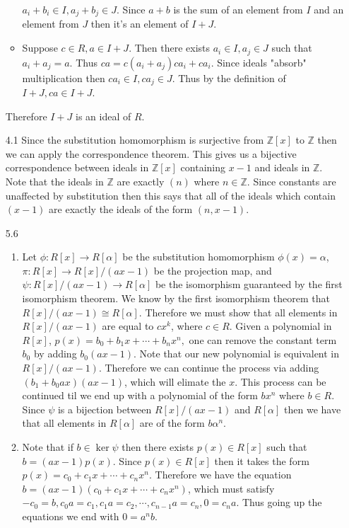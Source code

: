 \documentclass[12pt, letterpaper]{article}
\newcommand{\Z}{\mathbb{Z}}
\begin{document}
\begin{enumerate}
\begin{itemize}
	$a_i + b_i \in I, a_j + b_j \in J$.  Since $a+b$ is the sum of an element 
	from $I$ and an element from $J$ then it's an element of $I + J$.
	\item Suppose $c \in R, a \in I + J$.  Then there exists $a_i \in I, a_j \in J$
	such that $a_i + a_j = a$.  Thus $ca = c(a_i + a_j) c a_i + c a_i$.  Since 
	ideals "absorb" multiplication then $ca_i \in I, ca_j \in J$.  Thus by the 
	definition of $I+J, ca \in I+J$.  
	\end{itemize}
	Therefore $I+J$ is an ideal of $R$.
	\item[4.1] Since the substitution homomorphism is surjective from $\Z[x]$ to 
	$\Z$ then we can apply the correspondence theorem.  This gives us a bijective
	correspondence between ideals in $\Z[x]$ containing $x-1$ and ideals in $\Z$.  
	Note that the ideals in $\Z$ are exactly $(n)$ where $n \in \Z$.  Since constants are unaffected by substitution then this says that all of the ideals 
	which contain $(x-1)$ are exactly the ideals of the form $(n,x-1)$.  
	\item[5.6] 
	\begin{enumerate}
		\item Let $\phi: R[x] \to R[\alpha]$ be the substitution homomorphism 
		$\phi(x) = \alpha$, $\pi: R[x] \to R[x] / (ax-1)$ be the projection
		map, and $\psi : R[x]/(ax-1) \to R[\alpha]$ be the isomorphism guaranteed by the first isomorphism theorem.  We know by the first isomorphism theorem that $R[x] / (ax-1) \cong R[\alpha]$.  Therefore we must show that all elements in $R[x] / (ax-1)$ are 
		equal to $cx^k$, where $c \in R$.  Given a polynomial in $R[x]$, 
		$p(x) = b_0 + b_1 x + \cdots + b_n x^n,$ one can remove the constant term
		$b_0$ by adding $b_0(ax-1)$.  Note that our new polynomial is equivalent in $R[x]/(ax-1)$.  Therefore we can continue the process via adding $(b_1 + b_0 a x)(ax-1)$, which will elimate the $x$.  This process can be continued til we end up 
		with a polynomial of the form $b x^n$ where $b \in R$.  Since $\psi$ is a bijection between $R[x]/(ax-1)$ and $R[\alpha]$ then we have 
		that all elements in $R[\alpha]$ are of the form $b \alpha^n$.  
		\item Note that if $b \in \ker \psi$ then there exists $p(x) \in R[x]$
		such that $b = (ax-1)p(x)$.  Since $p(x) \in R[x]$ then it takes the form
		$p(x) = c_0 + c_1 x + \cdots + c_n x^n$.  Therefore we have the equation
		$b = (ax-1)(c_0 + c_1 x + \cdots + c_n x^n)$, which must satisfy 
		$-c_0  =b, c_0 a = c_1, c_1 a = c_2,\cdots, c_{n-1} a = c_{n}, 0 = c_n a$.
		Thus going up the equations we end with $0 = a^n b$.  
		

\end{enumerate}
\end{enumerate}
\end{document}
